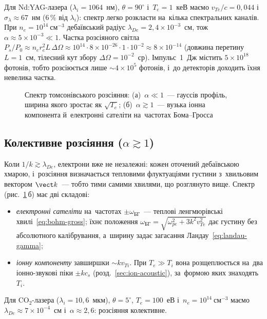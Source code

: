 \begin{Estimate}
Для Nd:YAG-лазера ($\lambda_i=1064$~нм), $\theta=90^\circ$ і~$T_e=1$~кеВ маємо
$v_{Te}/c=0{,}044$ і~$\sigma_\lambda\approx67$~нм (6\,\% від $\lambda_i$): спектр легко розкласти
на~кілька спектральних каналів. При $n_e=10^{14}~\text{см}^{-3}$ дебаївський радіус
$\lambda_{De}=2{,}4\times10^{-3}$~см, тож $\alpha\approx5\times10^{-3}\ll1$. Частка розсіяного світла
$P_s/P_0\approx n_er_e^2L\,\Delta\Omega\approx10^{14}\cdot8\times10^{-26}\cdot1\cdot10^{-2}\approx8\times10^{-14}$
(довжина перетину $L=1$~см, тілесний кут збору $\Delta\Omega=10^{-2}$~ср). Імпульс~1~Дж
містить $5\times10^{18}$ фотонів, тобто розсіюється лише $\sim4\times10^5$ фотонів, і~до детекторів
доходить їхня невелика частка.
\end{Estimate}

\begin{figure}[ht]\centering
	\begin{subfigure}[t]{0.5\linewidth}\centering
		\caption{}
	\end{subfigure}%
	\begin{subfigure}[t]{0.5\linewidth}\centering
		\caption{}
	\end{subfigure}
	\caption{Спектр томсонівського розсіяння: (а)~$\alpha\ll1$~--- гауссів профіль, ширина якого
	зростає як $\sqrt{T_e}$; (б)~$\alpha\gtrsim1$~--- вузька іонна компонента й~електронні
	сателіти на~частотах Бома--Гросса}
	\label{pic:thomson}
\end{figure}

\subsection*{Колективне розсіяння ($\alpha\gtrsim1$)}
Коли $1/k\gtrsim\lambda_{De}$, електрони вже не незалежні: кожен оточений дебаївською хмарою,
і~розсіяння визначається тепловими флуктуаціями густини з~хвильовим вектором $\vect k$~--- тобто
тими самими хвилями, що розглянуто вище. Спектр (рис.~\ref{pic:thomson}\,б) має дві складові:
\begin{itemize}
\item \emph{електронні сателіти} на~частотах $\pm\omega_{\text{БГ}}$~--- теплові ленгмюрівські
  хвилі~\eqref{eq:bohm-gross}; їхнє положення $\omega_{\text{БГ}}=\sqrt{\omega_{pe}^2+3k^2v_{Te}^2}$ дає густину без абсолютного калібрування,
  а~ширину задає загасання Ландау~\eqref{eq:landau-gamma};
\item \emph{іонну компоненту} завширшки $\sim kv_{Ti}$. При $T_e\gg T_i$ вона розщеплюється на~два
  іонно-звукові піки $\pm kc_s$ (розд.~\ref{sec:ion-acoustic}), за~формою яких знаходять~$T_i$.
\end{itemize}
\begin{Estimate}
Для CO$_2$-лазера ($\lambda_i=10{,}6$~мкм), $\theta=5^\circ$, $T_e=100$~еВ і~$n_e=10^{14}~\text{см}^{-3}$
маємо $\lambda_{De}\approx7\times10^{-4}$~см і~$\alpha\approx2{,}6$: розсіяння колективне.
\end{Estimate}

